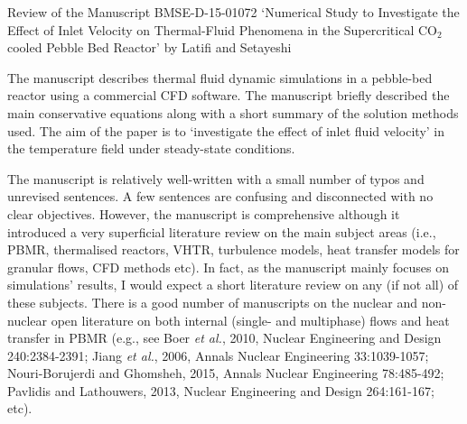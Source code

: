 \documentclass[14pt,twoside]{report}
\begin{document}


\clearpage



\begin{center}
  {\Large Review of the Manuscript BMSE-D-15-01072 `Numerical Study to Investigate the Effect of Inlet Velocity on Thermal-Fluid Phenomena in the Supercritical CO$_{2}$ cooled Pebble Bed Reactor' by Latifi and Setayeshi}
\end{center}

\medskip

The manuscript describes thermal fluid dynamic simulations in a pebble-bed reactor using a commercial CFD software. The manuscript briefly described the main conservative equations along with a short summary of the solution methods used. The aim of the paper is to `investigate the effect of inlet fluid velocity' in the temperature field under steady-state conditions.

The manuscript is relatively well-written with a small number of typos and unrevised sentences. A few sentences are confusing and disconnected with no clear objectives.  However, the manuscript is comprehensive although it introduced a very superficial literature review on the main subject areas (i.e., PBMR, thermalised reactors, VHTR, turbulence models, heat transfer models for granular flows, CFD methods etc). In fact, as the manuscript mainly focuses on simulations' results, I would expect a short literature review on any (if not all) of these subjects. There is a good number of manuscripts on the nuclear and non-nuclear open literature on both internal (single- and multiphase) flows and heat transfer in PBMR (e.g., see Boer {\it et al.}, 2010, Nuclear Engineering and Design 240:2384-2391; Jiang {\it et al.}, 2006, Annals Nuclear Engineering 33:1039-1057; Nouri-Borujerdi and Ghomsheh, 2015, Annals Nuclear Engineering 78:485-492; Pavlidis and Lathouwers, 2013, Nuclear Engineering and Design 264:161-167; etc).
\end{document}
